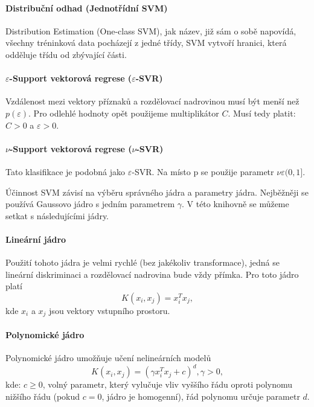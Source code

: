 \paragraph{Distribuční odhad (Jednotřídní SVM)}
Distribution Estimation (One-class SVM), jak název, již sám o sobě napovídá, všechny tréninková data pocházejí z jedné třídy, SVM vytvoří hranici, která odděluje třídu od zbývající části. \cite{oneclasssvm}

\paragraph{$\varepsilon$-Support vektorová regrese ($\varepsilon$-SVR)}
Vzdálenost mezi vektory příznaků a rozdělovací nadrovinou musí být menší než $p (\varepsilon)$. Pro odlehlé hodnoty opět použijeme multiplikátor $C$. Musí tedy platit: $C > 0$ a $\varepsilon > 0$. \cite{svrsvm}

\paragraph{$\nu$-Support vektorová regrese ($\nu$-SVR)}
Tato klasifikace je podobná jako $\varepsilon$-SVR. Na místo p se použije parametr $\nu \varepsilon (0,1]$. \cite{nusvmsvrclass}

Účinnost SVM závisí na výběru správného jádra a parametry jádra. Nejběžněji se používá Gaussovo jádro s jedním parametrem $\gamma$. V této knihovně se můžeme setkat s následujícími jádry.

\paragraph{Lineární jádro}
Použití tohoto jádra je velmi rychlé (bez jakékoliv transformace), jedná se lineární diskriminaci a rozdělovací nadrovina bude vždy přímka. Pro toto jádro platí 
\begin{equation*}
 \label{linearK}
  K(x_i, x_j) = x_i^T x_j,
\end{equation*}
  kde $x_i$ a $x_j$ jsou vektory vstupního prostoru.

\paragraph{Polynomické jádro}
Polynomické jádro umožňuje učení nelineárních modelů
\begin{equation*}
\label{polyK}
  K(x_i, x_j) = (\gamma x_i^T x_j + c)^{d}, \gamma > 0,
\end{equation*}
kde: $c \geq 0$, volný parametr, který vylučuje vliv vyššího řádu oproti polynomu nižšího řádu (pokud $c = 0$, jádro je homogenní), řád polynomu určuje parametr $d$.

